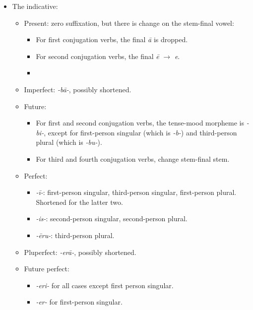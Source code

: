 \documentclass[a4paper, oneside]{report}
\newcommand{\corpus}[1]{\emph{#1}}
\begin{document}
\begin{itemize}
    \item The indicative:
    \begin{itemize}
        \item Present: zero suffixation, but there is change on the stem-final vowel:
        \begin{itemize}
            \item For first conjugation verbs, the final \corpus{\={a}} is dropped.
            \item For second conjugation verbs, the final \corpus{\={e}} $\to$ \corpus{e}.
            \item  
        \end{itemize}
        \item Imperfect: \corpus{-b\={a}-}, possibly shortened.
        \item Future: 
        \begin{itemize}
            \item For first and second conjugation verbs, 
            the tense-mood morpheme is \corpus{-bi-}, except for 
            first-person singular (which is \corpus{-b-})
            and third-person plural (which is \corpus{-bu-}).
            \item For third and fourth conjugation verbs, change stem-final stem.
        \end{itemize}
        \item Perfect: 
        \begin{itemize}
            \item \corpus{-ī-}: first-person singular, third-person singular, first-person plural.
            Shortened for the latter two.
            \item \corpus{-is-}: second-person singular, second-person plural.
            \item \corpus{-\={e}ru-}: third-person plural.
        \end{itemize}
        \item Pluperfect: \corpus{-er\={a}-}, possibly shortened.
        \item Future perfect: 
        \begin{itemize}
            \item \corpus{-eri-} for all cases except first person singular.
            \item \corpus{-er-} for first-person singular.
        \end{itemize}
    \end{itemize}

\end{itemize}
\end{document}
